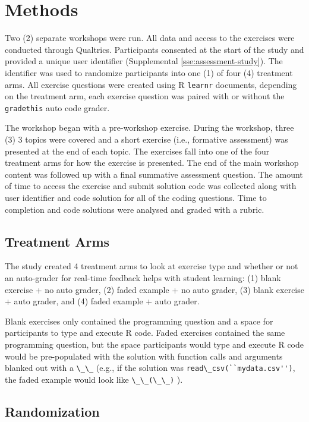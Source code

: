 \documentclass[acmsmall]{acmart}
\newcommand{\code}[1]{\lstinline{#1}}
\begin{document}
\section{Methods}


Two (2) separate workshops were run.
All data and access to the exercises were conducted through Qualtrics.
Participants consented at the start of the study and provided a unique user identifier
(Supplemental \ref{sse:assessment-study}).
The identifier was used to randomize participants into one (1) of four (4) treatment arms.
All exercise questions were created using R \code{learnr} documents,
depending on the treatment arm, each exercise question was paired with or without
the \code{gradethis} auto code grader.

The workshop began with a pre-workshop exercise.
During the workshop, three (3) 3 topics were covered and a short exercise (i.e., formative assessment)
was presented at the end of each topic.
The exercises fall into one of the four treatment arms for how the exercise is presented.
The end of the main workshop content was followed up with a final summative assessment question.
The amount of time to access the exercise and submit solution code was collected
along with user identifier and code solution for all of the coding questions.
Time to completion and code solutions were analysed and graded with a rubric.

\subsection{Treatment Arms}

The study created 4 treatment arms to look at exercise type and whether or not an auto-grader for
real-time feedback helps with student learning:
(1) blank exercise + no auto grader,
(2) faded example + no auto grader,
(3) blank exercise + auto grader, and
(4) faded example + auto grader.

Blank exercises only contained the programming question and a space for participants to type and execute R code.
Faded exercises contained the same programming question,
but the space participants would type and execute R code would be pre-populated with the solution with
function calls and arguments blanked out with a \code{\_\_}
(e.g., if the solution was \code{read\_csv(``mydata.csv'')},
the faded example would look like \code{\_\_(\_\_)} ).

\subsection{Randomization}
\end{document}
